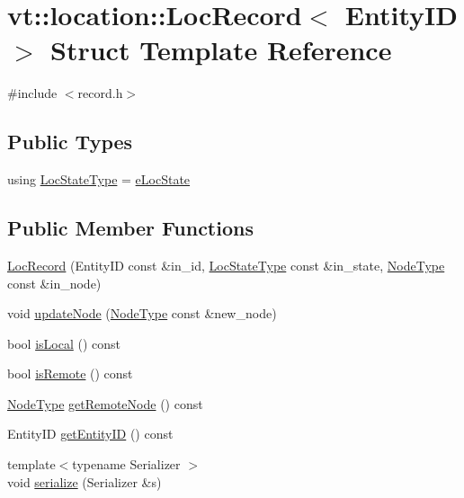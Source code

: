 \hypertarget{structvt_1_1location_1_1_loc_record}{}\section{vt\+:\+:location\+:\+:Loc\+Record$<$ Entity\+ID $>$ Struct Template Reference}
\label{structvt_1_1location_1_1_loc_record}


{\ttfamily \#include $<$record.\+h$>$}

\subsection*{Public Types}
\begin{DoxyCompactItemize}
\item 
using \hyperlink{structvt_1_1location_1_1_loc_record_a292a4bfaf13edb8d1c2e7a4fdd5421fb}{Loc\+State\+Type} = \hyperlink{namespacevt_1_1location_a7a5c74aad68cf57281515029d8521547}{e\+Loc\+State}
\end{DoxyCompactItemize}
\subsection*{Public Member Functions}
\begin{DoxyCompactItemize}
\item 
\hyperlink{structvt_1_1location_1_1_loc_record_ade33ca9b748edfc1cacdf1738700ef5b}{Loc\+Record} (Entity\+ID const \&in\+\_\+id, \hyperlink{namespacevt_1_1location_a7a5c74aad68cf57281515029d8521547}{Loc\+State\+Type} const \&in\+\_\+state, \hyperlink{namespacevt_a866da9d0efc19c0a1ce79e9e492f47e2}{Node\+Type} const \&in\+\_\+node)
\item 
void \hyperlink{structvt_1_1location_1_1_loc_record_aa66e4f13e89526636b87b3c950bdd91c}{update\+Node} (\hyperlink{namespacevt_a866da9d0efc19c0a1ce79e9e492f47e2}{Node\+Type} const \&new\+\_\+node)
\item 
bool \hyperlink{structvt_1_1location_1_1_loc_record_af3bb2160b4ad36664ef47171cf6d58a4}{is\+Local} () const
\item 
bool \hyperlink{structvt_1_1location_1_1_loc_record_a891b73a9c0092f6b022514309190cc8e}{is\+Remote} () const
\item 
\hyperlink{namespacevt_a866da9d0efc19c0a1ce79e9e492f47e2}{Node\+Type} \hyperlink{structvt_1_1location_1_1_loc_record_ada9c469d3fd01a0eaed1af3a99fc9b2c}{get\+Remote\+Node} () const
\item 
Entity\+ID \hyperlink{structvt_1_1location_1_1_loc_record_a710d9bbd99da0c19d1270a06eff6dd6a}{get\+Entity\+ID} () const
\item 
{\footnotesize template$<$typename Serializer $>$ }\\void \hyperlink{structvt_1_1location_1_1_loc_record_ae7b5c9187750abeb27c72ee260557aed}{serialize} (Serializer \&s)
\end{DoxyCompactItemize}
